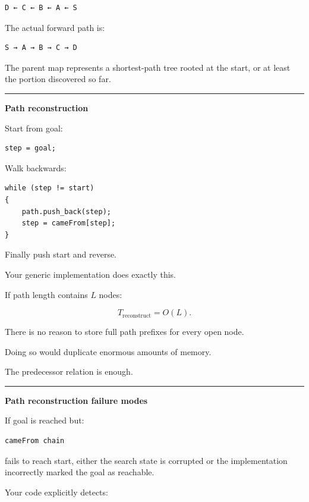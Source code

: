 \begin{verbatim}
D ← C ← B ← A ← S
\end{verbatim}

The actual forward path is:

\begin{verbatim}
S → A → B → C → D
\end{verbatim}

The parent map represents a shortest-path tree rooted at the start, or at least the portion discovered so far.

\begin{center}\rule{0.5\linewidth}{0.5pt}\end{center}

\textbf{Path reconstruction}

Start from goal:

\begin{verbatim}
step = goal;
\end{verbatim}

Walk backwards:

\begin{verbatim}
while (step != start)
{
    path.push_back(step);
    step = cameFrom[step];
}
\end{verbatim}

Finally push start and reverse.

Your generic implementation does exactly this.

If path length contains \(L\) nodes:

\[
T_{\text{reconstruct}}
=
O(L).
\]

There is no reason to store full path prefixes for every open node.

Doing so would duplicate enormous amounts of memory.

The predecessor relation is enough.

\begin{center}\rule{0.5\linewidth}{0.5pt}\end{center}

\textbf{Path reconstruction failure modes}

If goal is reached but:

\begin{verbatim}
cameFrom chain
\end{verbatim}

fails to reach start, either the search state is corrupted or the implementation incorrectly marked the goal as reachable.

Your  code explicitly detects:

